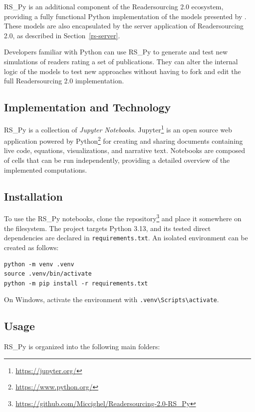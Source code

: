 \documentclass[a4paper, english]{article}
\newcommand{\rspy}{RS\_Py\xspace}
\begin{document}
\label{rs-py}

\rspy \cite{RS-Py} is an additional component of the Readersourcing 2.0 ecosystem, providing a fully functional Python implementation of the models presented by \citet{Soprano2019}. These models are also encapsulated by the server application of Readersourcing 2.0, as described in Section~\ref{rs-server}.

Developers familiar with Python can use \rspy to generate and test new simulations of readers rating a set of publications. They can alter the internal logic of the models to test new approaches without having to fork and edit the full Readersourcing 2.0 implementation.

\subsection{Implementation and Technology}

\rspy is a collection of \emph{Jupyter Notebooks}. Jupyter\footnote{\url{https://jupyter.org/}} is an open source web application powered by Python\footnote{\url{https://www.python.org/}} for creating and sharing documents containing live code, equations, visualizations, and narrative text. Notebooks are composed of cells that can be run independently, providing a detailed overview of the implemented computations.

\subsection{Installation}

To use the \rspy notebooks, clone the repository\footnote{\url{https://github.com/Miccighel/Readersourcing-2.0-RS_Py}} and place it somewhere on the filesystem. The project targets Python 3.13, and its tested direct dependencies are declared in \verb|requirements.txt|. An isolated environment can be created as follows:

\begin{lstlisting}
python -m venv .venv
source .venv/bin/activate
python -m pip install -r requirements.txt
\end{lstlisting}

On Windows, activate the environment with \verb|.venv\Scripts\activate|.

\subsection{Usage}

\rspy is organized into the following main folders:
\end{document}
